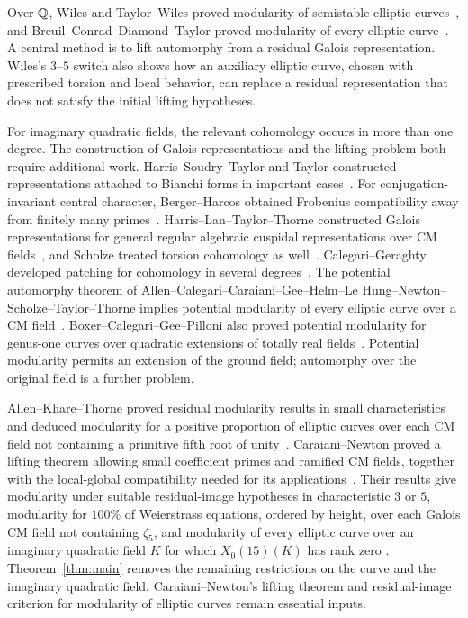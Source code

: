 Over $\mathbb Q$, Wiles and Taylor--Wiles proved modularity of semistable
elliptic curves~\cite{Wiles,TaylorWiles}, and
Breuil--Conrad--Diamond--Taylor proved modularity of every elliptic
curve~\cite{BCDT}. A central method is to lift automorphy from a residual
Galois representation. Wiles's $3$--$5$ switch also shows how an auxiliary
elliptic curve, chosen with prescribed torsion and local behavior, can
replace a residual representation that does not satisfy the initial
lifting hypotheses.

For imaginary quadratic fields, the relevant cohomology occurs in more
than one degree. The construction of Galois representations and the
lifting problem both require additional work. Harris--Soudry--Taylor and
Taylor constructed representations attached to Bianchi forms in important
cases~\cite{HST,Taylor1994}. For conjugation-invariant central character,
Berger--Harcos obtained Frobenius compatibility away from finitely many
primes~\cite{BergerHarcos}. Harris--Lan--Taylor--Thorne constructed
Galois representations for general regular algebraic cuspidal
representations over CM fields~\cite{HLTT}, and Scholze treated torsion
cohomology as well~\cite{Scholze}. Calegari--Geraghty developed patching
for cohomology in several degrees~\cite{CalegariGeraghty}.
The potential automorphy theorem of
Allen--Calegari--Caraiani--Gee--Helm--Le Hung--Newton--Scholze--Taylor--Thorne
implies potential modularity of every elliptic curve over a CM
field~\cite[Theorem~1.0.1]{ACC}. Boxer--Calegari--Gee--Pilloni also proved
potential modularity for genus-one curves over quadratic extensions of
totally real fields~\cite[Theorem~1.1.4]{BCGP}. Potential modularity permits
an extension of the ground field; automorphy over the original field is a
further problem.

Allen--Khare--Thorne proved residual modularity results in small
characteristics and deduced modularity for a positive proportion of
elliptic curves over each CM field not containing a primitive fifth root
of unity~\cite{AKT}. Caraiani--Newton proved a lifting theorem allowing
small coefficient primes and ramified CM fields, together with the
local-global compatibility needed for its applications~\cite{CN}.
Their results give modularity under suitable residual-image hypotheses
in characteristic $3$ or $5$, modularity for $100\%$ of Weierstrass
equations, ordered by height, over each Galois CM field not containing $\zeta_5$, and
modularity of every elliptic curve over an imaginary quadratic field
$K$ for which $X_0(15)(K)$ has rank zero
\cite[Theorem~6.1 and Corollaries~6.1.2 and~7.1.2]{CN}.
Theorem~\ref{thm:main} removes the remaining restrictions on the curve
and the imaginary quadratic field. Caraiani--Newton's lifting theorem
and residual-image criterion for modularity of elliptic curves remain
essential inputs.

